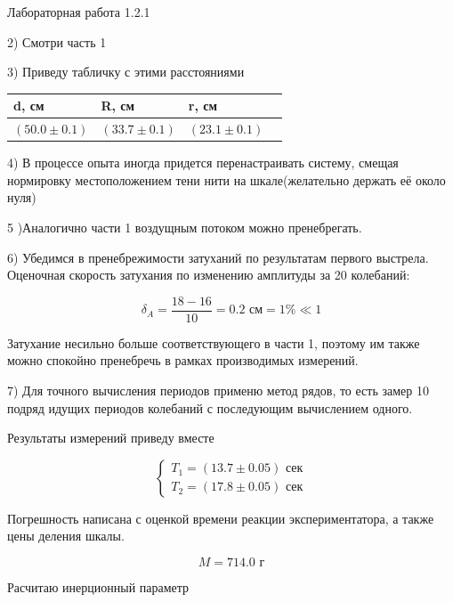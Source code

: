 \documentclass{astroedu-lab}
\begin{document}
\begin{problem}{\large Лабораторная работа 1.2.1}
\begin{center}
\label{fig:mpr}

\end{center}

2) Смотри часть 1

3) Приведу табличку с этими расстояниями

\begin{center}
\begin{tabular}[t]{|l|l|l|l|}
\hline
d, см & R, см & r, см \\
\hline
$(50.0 \pm 0.1)$ & $(33.7 \pm 0.1)$ & $(23.1 \pm 0.1)$ \\
\hline
\end{tabular}
\end{center}

4) В процессе опыта иногда придется перенастраивать систему, смещая нормировку местоположением тени нити на шкале(желательно держать её около нуля)

5 )Аналогично части 1 воздущным потоком можно пренебрегать.

6) Убедимся в пренебрежимости затуханий по результатам первого выстрела. Оценочная скорость затухания по изменению амплитуды за 20 колебаний:

\begin{equation}
	\delta_A = \frac{18 - 16}{10} = 0.2 \text{ см} = 1 \% \ll 1
\end{equation}

Затухание несильно больше соответствующего в части 1, поэтому им также можно спокойно пренебречь в рамках производимых измерений.

7) Для точного вычисления периодов применю метод рядов, то есть замер 10 подряд идущих периодов колебаний с последующим вычислением одного.

Результаты измерений приведу вместе

\begin{equation}
	\left\{
		\begin{aligned}
			T_1 = (13.7 \pm 0.05) \text{ сек} \\
			T_2 = (17.8 \pm 0.05) \text{ сек}
		\end{aligned}
	\right.
\end{equation}

Погрешность написана с оценкой времени реакции экспериментатора, а также цены деления шкалы.

\begin{equation}
	M = 714.0 \text{ г}
\end{equation}

Расчитаю инерционный параметр


\end{problem}
\end{document}

